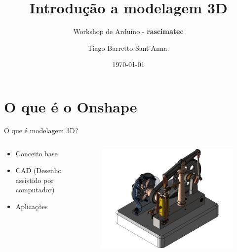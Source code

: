 \documentclass{cubeamer}
\title{Introdução a modelagem 3D}
\subtitle{Workshop de Arduino - \textbf{rascimatec}}
\author[Tiago Barretto Sant'Anna]{Tiago Barretto Sant'Anna.}
\date{\today} %
\institute[SENAI CIMATEC]{SENAI CIMATEC - IEEE ROBOTICS AND AUTOMATION SOCIETY}
\begin{document}
\maketitle

\cutoc

\section{O que é o Onshape}

\begin{frame}{O que é modelagem 3D?}
    \begin{columns}

        \begin{column}{0.4\textwidth}
            \begin{itemize}
                \item Conceito base
                \item CAD (Desenho assistido por computador)
                \item Aplicações
            \end{itemize}
        \end{column}

        \begin{column}{0.6\textwidth}
            \begin{figure}
                \centering
                \includegraphics[height = 0.7\textheight]{img/bomba.png}
                \caption{\cite{Bomba:online}}
            \end{figure}
        \end{column}

    \end{columns}
\end{frame}
\end{document}
